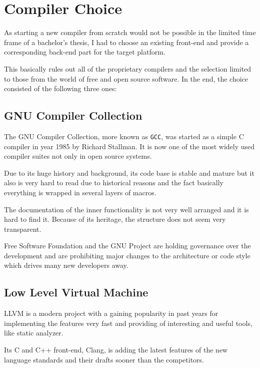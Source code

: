 \chapter{Compiler Choice}\label{compiler}

As starting a new compiler from scratch would not be possible in the limited time frame of a bachelor's thesis, I had to choose an existing front-end and provide a corresponding back-end part for the target platform.

This basically rules out all of the proprietary compilers and the selection limited to those from the world of free and open source software. In the end, the choice consisted of the following three ones:


    \section{GNU Compiler Collection}\label{gcc}

    The GNU Compiler Collection, more known as \texttt{GCC}, was started as a simple C compiler in year 1985 by Richard Stallman. It is now one of the most widely used compiler suites not only in open source systems.

    Due to its huge history and background, its code base is stable and mature but it also is very hard to read due to historical reasons and the fact basically everything is wrapped in several layers of macros.

    The documentation of the inner functionality is not very well arranged and it is hard to find it. Because of its heritage, the structure does not seem very transparent.

    Free Software Foundation and the GNU Project are holding governance over the development and are prohibiting major changes to the architecture or code style which drives many new developers away.

    \section{Low Level Virtual Machine}\label{llvm}

    LLVM is a modern project with a gaining popularity in past years for implementing the features very fast and providing of interesting and useful tools, like static analyzer.

    Its C and C++ front-end, Clang, is adding the latest features of the new language standards and their drafts sooner than the competitors.

